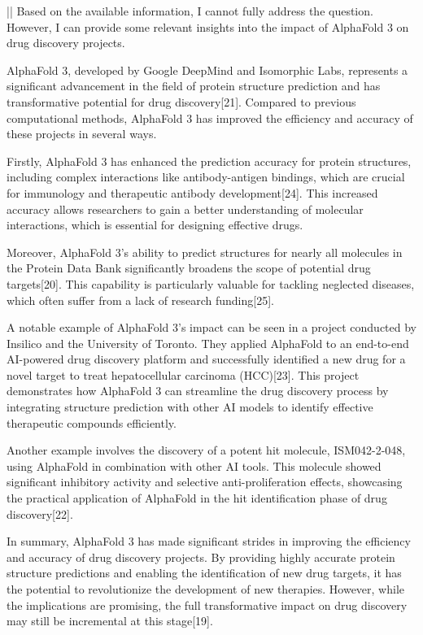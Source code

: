 \documentclass[11pt]{article}
\begin{document}
\begin{showcase}[title=Topic: AlphaFold 3]
||
Based on the available information, I cannot fully address the question. However, I can provide some relevant insights into the impact of AlphaFold 3 on drug discovery projects.

AlphaFold 3, developed by Google DeepMind and Isomorphic Labs, represents a significant advancement in the field of protein structure prediction and has transformative potential for drug discovery[21]. Compared to previous computational methods, AlphaFold 3 has improved the efficiency and accuracy of these projects in several ways.

Firstly, AlphaFold 3 has enhanced the prediction accuracy for protein structures, including complex interactions like antibody-antigen bindings, which are crucial for immunology and therapeutic antibody development[24]. This increased accuracy allows researchers to gain a better understanding of molecular interactions, which is essential for designing effective drugs.

Moreover, AlphaFold 3's ability to predict structures for nearly all molecules in the Protein Data Bank significantly broadens the scope of potential drug targets[20]. This capability is particularly valuable for tackling neglected diseases, which often suffer from a lack of research funding[25].

A notable example of AlphaFold 3's impact can be seen in a project conducted by Insilico and the University of Toronto. They applied AlphaFold to an end-to-end AI-powered drug discovery platform and successfully identified a new drug for a novel target to treat hepatocellular carcinoma (HCC)[23]. This project demonstrates how AlphaFold 3 can streamline the drug discovery process by integrating structure prediction with other AI models to identify effective therapeutic compounds efficiently.

Another example involves the discovery of a potent hit molecule, ISM042-2-048, using AlphaFold in combination with other AI tools. This molecule showed significant inhibitory activity and selective anti-proliferation effects, showcasing the practical application of AlphaFold in the hit identification phase of drug discovery[22].

In summary, AlphaFold 3 has made significant strides in improving the efficiency and accuracy of drug discovery projects. By providing highly accurate protein structure predictions and enabling the identification of new drug targets, it has the potential to revolutionize the development of new therapies. However, while the implications are promising, the full transformative impact on drug discovery may still be incremental at this stage[19].


\end{showcase}
\end{document}
